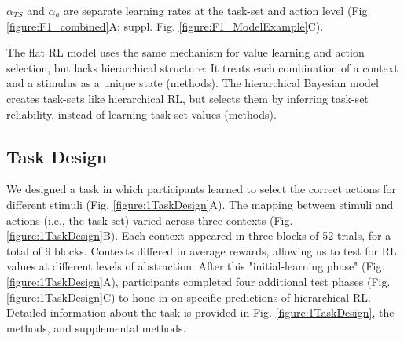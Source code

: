 \documentclass[10pt,letterpaper]{article}  %
\newcommand{\rev}{\color{black}}
\begin{document}
$\alpha_{TS}$ and $\alpha_a$ are separate learning rates at the task-set and action level (Fig. \ref{figure:F1_combined}A; suppl. Fig. \ref{figure:F1_ModelExample}C). 

{\rev The flat RL model uses the same mechanism for value learning and action selection, but lacks hierarchical structure: It treats each combination of a context and a stimulus as a unique state (methods).
The hierarchical Bayesian model creates task-sets like hierarchical RL, but selects them by inferring task-set reliability, instead of learning task-set values (methods).}

\subsection*{Task Design}
We designed a task in which participants learned to select the correct actions for different stimuli (Fig. \ref{figure:1TaskDesign}A). The mapping between stimuli and actions (i.e., the task-set) varied across three contexts (Fig. \ref{figure:1TaskDesign}B). Each context appeared in three blocks of 52 trials, for a total of 9 blocks. Contexts differed in average rewards, allowing us to test for RL values at different levels of abstraction.
After this "initial-learning phase" (Fig. \ref{figure:1TaskDesign}A), participants completed four additional test phases (Fig. \ref{figure:1TaskDesign}C) to hone in on specific predictions of hierarchical RL.
Detailed information about the task is provided in Fig. \ref{figure:1TaskDesign}, the methods, and supplemental methods.
\end{document}
